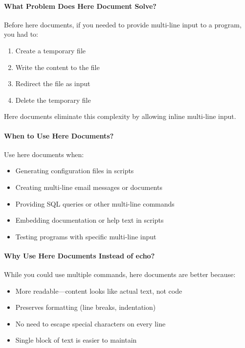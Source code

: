 \paragraph{What Problem Does Here Document Solve?}

Before here documents, if you needed to provide multi-line input to a program, you had to:
\begin{enumerate}
	\item Create a temporary file
	\item Write the content to the file
	\item Redirect the file as input
	\item Delete the temporary file
\end{enumerate}

Here documents eliminate this complexity by allowing inline multi-line input.

\paragraph{When to Use Here Documents?}

Use here documents when:
\begin{itemize}
	\item Generating configuration files in scripts
	\item Creating multi-line email messages or documents
	\item Providing SQL queries or other multi-line commands
	\item Embedding documentation or help text in scripts
	\item Testing programs with specific multi-line input
\end{itemize}

\paragraph{Why Use Here Documents Instead of echo?}

While you could use multiple  commands, here documents are better because:
\begin{itemize}
	\item More readable---content looks like actual text, not code
	\item Preserves formatting (line breaks, indentation)
	\item No need to escape special characters on every line
	\item Single block of text is easier to maintain
\end{itemize}

